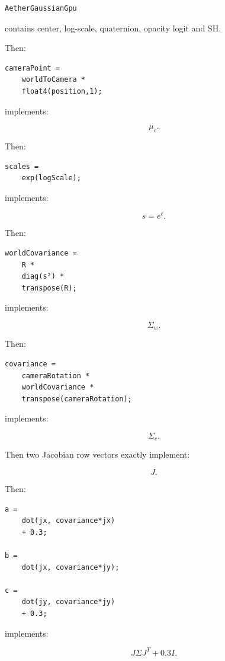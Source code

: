 \protect{}\label{pcn1vt}%
\begin{verbatim}
AetherGaussianGpu
\end{verbatim}

contains center, log-scale, quaternion, opacity logit and SH.

Then:

\protect{}\label{3sxvec}%
\begin{verbatim}
cameraPoint =
    worldToCamera *
    float4(position,1);
\end{verbatim}

implements:

\[
\mu_c.
\]

Then:

\protect{}\label{9a8s32}%
\begin{verbatim}
scales =
    exp(logScale);
\end{verbatim}

implements:

\[
s=e^\ell.
\]

Then:

\protect{}\label{d32mgd}%
\begin{verbatim}
worldCovariance =
    R *
    diag(s²) *
    transpose(R);
\end{verbatim}

implements:

\[
\Sigma_w.
\]

Then:

\protect{}\label{bwtx1c}%
\begin{verbatim}
covariance =
    cameraRotation *
    worldCovariance *
    transpose(cameraRotation);
\end{verbatim}

implements:

\[
\Sigma_c.
\]

Then two Jacobian row vectors exactly implement:

\[
J.
\]

Then:

\protect{}\label{bd7vol}%
\begin{verbatim}
a =
    dot(jx, covariance*jx)
    + 0.3;

b =
    dot(jx, covariance*jy);

c =
    dot(jy, covariance*jy)
    + 0.3;
\end{verbatim}

implements:

\[
J\Sigma J^T+0.3I.
\]

